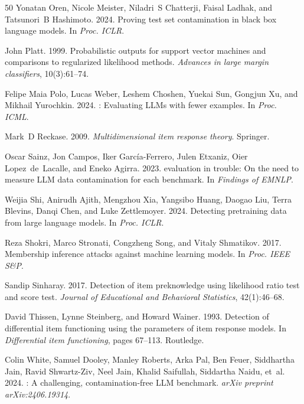 \documentclass[11pt,a4paper]{article}
\begin{document}
\begin{thebibliography}{50}
Yonatan Oren, Nicole Meister, Niladri~S Chatterji, Faisal Ladhak, and Tatsunori~B Hashimoto. 2024.
\newblock Proving test set contamination in black box language models.
\newblock In \emph{Proc. ICLR}.

John Platt. 1999.
\newblock Probabilistic outputs for support vector machines and comparisons to regularized likelihood methods.
\newblock \emph{Advances in large margin classifiers}, 10(3):61--74.

Felipe Maia Polo, Lucas Weber, Leshem Choshen, Yuekai Sun, Gongjun Xu, and Mikhail Yurochkin. 2024.
: Evaluating {LLM}s with fewer examples.
\newblock In \emph{Proc. ICML}.

Mark~D Reckase. 2009.
\newblock \emph{Multidimensional item response theory}.
\newblock Springer.

Oscar Sainz, Jon Campos, Iker García-Ferrero, Julen Etxaniz, Oier Lopez~de~Lacalle, and Eneko Agirra. 2023.
 evaluation in trouble: On the need to measure {LLM} data contamination for each benchmark.
\newblock In \emph{Findings of EMNLP}.

Weijia Shi, Anirudh Ajith, Mengzhou Xia, Yangsibo Huang, Daogao Liu, Terra Blevins, Danqi Chen, and Luke Zettlemoyer. 2024.
\newblock Detecting pretraining data from large language models.
\newblock In \emph{Proc. ICLR}.

Reza Shokri, Marco Stronati, Congzheng Song, and Vitaly Shmatikov. 2017.
\newblock Membership inference attacks against machine learning models.
\newblock In \emph{Proc. IEEE S\&P}.

Sandip Sinharay. 2017.
\newblock Detection of item preknowledge using likelihood ratio test and score test.
\newblock \emph{Journal of Educational and Behavioral Statistics}, 42(1):46--68.

David Thissen, Lynne Steinberg, and Howard Wainer. 1993.
\newblock Detection of differential item functioning using the parameters of item response models.
\newblock In \emph{Differential item functioning}, pages 67--113. Routledge.

Colin White, Samuel Dooley, Manley Roberts, Arka Pal, Ben Feuer, Siddhartha Jain, Ravid Shwartz-Ziv, Neel Jain, Khalid Saifullah, Siddartha Naidu, et~al. 2024.
: A challenging, contamination-free {LLM} benchmark.
\newblock \emph{arXiv preprint arXiv:2406.19314}.


\end{thebibliography}
\end{document}
